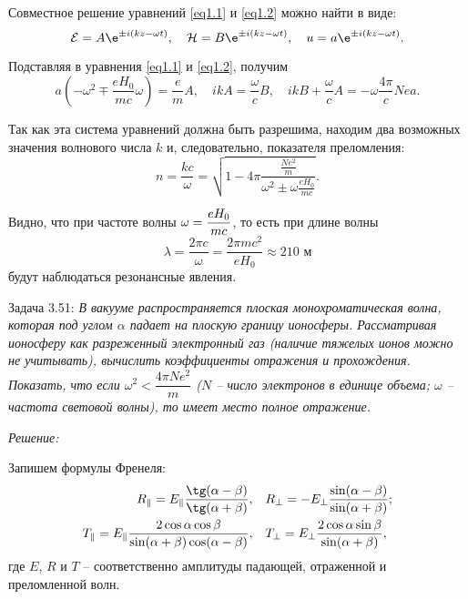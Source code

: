 Совместное решение уравнений \eqref{eq1.1} и \eqref{eq1.2} можно найти в виде:
\[
    \E = A\e^{\pm i(kz - \omega t)}, \quad
    \H = B\e^{\pm i(kz - \omega t)}, \quad
    u = a\e^{\pm i(kz - \omega t)}.
\]

Подставляя в уравнения \eqref{eq1.1} и \eqref{eq1.2}, получим
\[
    a\left(-\omega^2 \mp \frac{eH_0}{mc}\omega\right) = \frac{e}{m}A, \quad
    ikA = \frac{\omega}{c}B, \quad
    ikB + \frac{\omega}{c}A = -\omega\frac{4\pi}{c}Nea.
\]

Так как эта система уравнений должна быть разрешима, находим два возможных
значения волнового числа \( k \) и, следовательно, показателя преломления:
\[
    n = \frac{kc}{\omega} = \sqrt{1 - 4\pi\frac{\frac{Ne^2}{m}}
    {\omega^2 \pm \omega\frac{eH_0}{mc}}}.
\]

Видно, что при частоте волны \( \displaystyle \omega = \frac{eH_0}{mc} \), то есть при
длине волны
\[
    \lambda = \frac{2\pi c}{\omega} = \frac{2\pi mc^2}{eH_0} \approx 210\text{ м}
\]
будут наблюдаться резонансные явления.

\newpage \reset
Задача 3.51: \emph{В вакууме распространяется плоская монохроматическая волна,
которая под углом \( \alpha \) падает на плоскую границу ионосферы.
Рассматривая ионосферу как разреженный электронный газ (наличие тяжелых ионов
можно не учитывать), вычислить коэффициенты отражения и прохождения. Показать,
что если \( \omega^2 < \dfrac{4\pi Ne^2}{m} \) (\( N \) -- число электронов в
единице объема; \( \omega \) -- частота световой волны), то имеет место полное
отражение.}

\vspace*{2em}
\emph{Решение:}

Запишем формулы Френеля:
\begin{align*}
    R_\| = E_\|\frac{\tg(\alpha-\beta)}{\tg(\alpha+\beta)}, &&&
    R_\perp = -E_\perp\frac{\sin(\alpha-\beta)}{\sin(\alpha+\beta)}; \\
    T_\| = E_\|\frac{2\cos\alpha\cos\beta}{\sin(\alpha+\beta)
    \cos(\alpha-\beta)}, &&&
    T_\perp = E_\perp\frac{2\cos\alpha\sin\beta}{\sin(\alpha+\beta)},
\end{align*}
где \( E \), \( R \) и \( T \) -- соответственно амплитуды падающей, отраженной
и преломленной волн.

